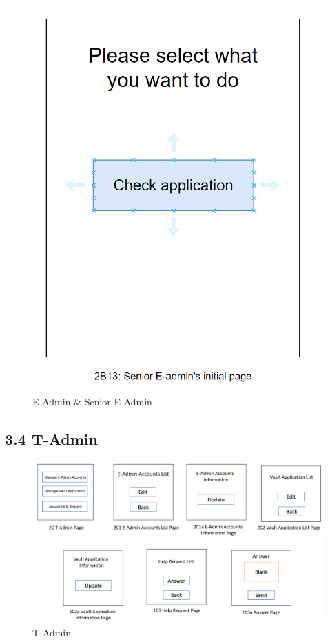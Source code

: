 \documentclass[a4paper,12pt]{article}
\begin{document}
\begin{figure}[H]
    \begin{center}
        \includegraphics[width=\textwidth]{picture/3423429812.png}
        \caption{E-Admin \& Senior E-Admin}
        \label{fig:access-thesis}
    \end{center}
\end{figure}

\subsection*{3.4 T-Admin}
\begin{figure}[H]
    \begin{center}
        \includegraphics[width=\textwidth]{picture/WechatIMG338.jpg}
        \caption{T-Admin}
        \label{fig:pay-service}
    \end{center}
\end{figure}
\end{document}
